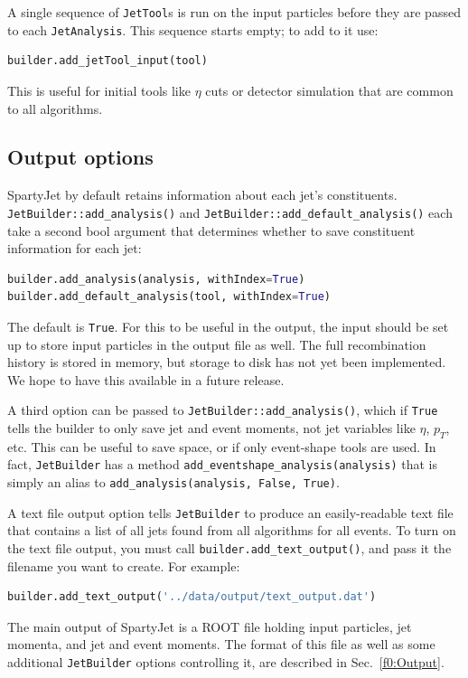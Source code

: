 \documentclass{article}
\newcommand{\prog}[1]{{\sc #1}\xspace}
\newcommand{\code}[1]{{\tt #1}\xspace}
\newcommand{\codes}[1]{{\tt #1}s\xspace}
\newcommand{\SJ}[0]{\prog{SpartyJet}}
\begin{document}
A single sequence of \codes{JetTool} is run on the input particles before they are passed to each \code{JetAnalysis}.  This sequence starts empty; to add to it use:
\begin{lstlisting}[language=Python]
builder.add_jetTool_input(tool)
\end{lstlisting}
This is useful for initial tools like $\eta$ cuts or detector simulation that are common to all algorithms.



\subsection{Output options}
\SJ by default retains information about each jet's constituents.  \code{JetBuilder::add\_analysis()} and \code{JetBuilder::add\_default\_analysis()} each take a second bool argument that determines whether to save constituent information for each jet:
\begin{lstlisting}[language=Python]
builder.add_analysis(analysis, withIndex=True)
builder.add_default_analysis(tool, withIndex=True)
\end{lstlisting}
The default is \verb+True+.  For this to be useful in the output, the input should be set up to store input particles in the output file as well.  The full recombination history is stored in memory, but storage to disk has not yet been implemented.  We hope to have this available in a future release.

A third option can be passed to \code{JetBuilder::add\_analysis()}, which if \verb+True+ tells the builder to only save jet and event moments, not jet variables like $\eta$, $p_T$, etc.  This can be useful to save space, or if only event-shape tools are used.  In fact, \code{JetBuilder} has a method \code{add\_eventshape\_analysis(analysis)} that is simply an alias to \code{add\_analysis(analysis, False, True)}.

A text file output option tells \code{JetBuilder} to produce an easily-readable text file that contains a list of all jets found from all algorithms for all events.  To turn on the text file output, you must call \code{builder.add\_text\_output()}, and pass it the filename you want to create. For example:
\begin{lstlisting}[language=Python]
builder.add_text_output('../data/output/text_output.dat')
\end{lstlisting}

The main output of \SJ is a \prog{ROOT} file holding input particles, jet momenta, and jet and event moments.  The format of this file as well as some additional \code{JetBuilder} options controlling it, are described in Sec.~\ref{f0:Output}.
\end{document}
